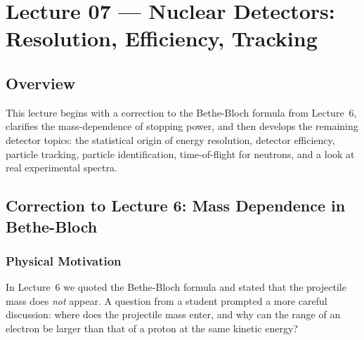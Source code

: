 
\section{Lecture 07 — Nuclear Detectors: Resolution, Efficiency, Tracking}
\label{sec:lec07}
\date{26 May 2026}

\subsection*{Overview}
This lecture begins with a correction to the Bethe-Bloch formula from Lecture~6,
clarifies the mass-dependence of stopping power, and then develops the remaining
detector topics: the statistical origin of energy resolution, detector efficiency,
particle tracking, particle identification, time-of-flight for neutrons, and a
look at real experimental spectra.

\subsection{Correction to Lecture 6: Mass Dependence in Bethe-Bloch}
\label{subsec:lec07:bethe_correction}

\subsubsection*{Physical Motivation}
In Lecture~6 we quoted the Bethe-Bloch formula and stated that the projectile
mass does \emph{not} appear.  A question from a student prompted a more careful
discussion: where does the projectile mass enter, and why can the range of an
electron be larger than that of a proton at the same kinetic energy?

